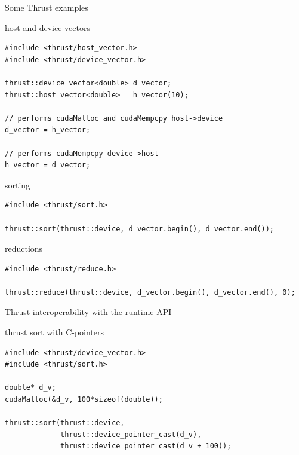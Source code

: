 \documentclass[aspectratio=43]{beamer}
\begin{document}
\begin{frame}[fragile]{Some Thrust examples}

    \begin{code}{host and device vectors}
        \begin{lstlisting}[style=boxcudatiny]
#include <thrust/host_vector.h>
#include <thrust/device_vector.h>

thrust::device_vector<double> d_vector;
thrust::host_vector<double>   h_vector(10);

// performs cudaMalloc and cudaMempcpy host->device
d_vector = h_vector;

// performs cudaMempcpy device->host
h_vector = d_vector;
        \end{lstlisting}
    \end{code}

    \begin{code}{sorting}
        \begin{lstlisting}[style=boxcudatiny]
#include <thrust/sort.h>

thrust::sort(thrust::device, d_vector.begin(), d_vector.end());
        \end{lstlisting}
    \end{code}

    \begin{code}{reductions}
        \begin{lstlisting}[style=boxcudatiny]
#include <thrust/reduce.h>

thrust::reduce(thrust::device, d_vector.begin(), d_vector.end(), 0);
        \end{lstlisting}
    \end{code}

\end{frame}

\begin{frame}[fragile]{Thrust interoperability with the runtime API}

    \begin{code}{thrust sort with C-pointers}
        \begin{lstlisting}[style=boxcudatiny]
#include <thrust/device_vector.h>
#include <thrust/sort.h>

double* d_v;
cudaMalloc(&d_v, 100*sizeof(double));

thrust::sort(thrust::device,
             thrust::device_pointer_cast(d_v),
             thrust::device_pointer_cast(d_v + 100));
        \end{lstlisting}
    \end{code}     

\end{frame}
\end{document}
